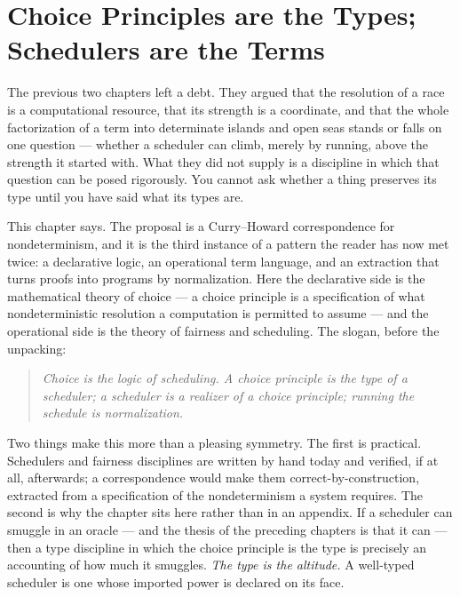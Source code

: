\chapter{Choice Principles are the Types; Schedulers are the Terms}
\label{ch:chs}

\noindent
The previous two chapters left a debt. They argued that the resolution of a race is a
computational resource, that its strength is a coordinate, and that the whole
factorization of a term into determinate islands and open seas stands or falls on one
question --- whether a scheduler can climb, merely by running, above the strength it
started with. What they did not supply is a discipline in which that question can be
posed rigorously. You cannot ask whether a thing preserves its type until you have said
what its types are.

This chapter says. The proposal is a Curry--Howard correspondence for nondeterminism,
and it is the third instance of a pattern the reader has now met twice: a declarative
logic, an operational term language, and an extraction that turns proofs into programs
by normalization. Here the declarative side is the mathematical theory of choice --- a
choice principle is a specification of what nondeterministic resolution a computation
is permitted to assume --- and the operational side is the theory of fairness and
scheduling. The slogan, before the unpacking:

\begin{quote}
\emph{Choice is the logic of scheduling. A choice principle is the type of a scheduler;
a scheduler is a realizer of a choice principle; running the schedule is
normalization.}
\end{quote}

\noindent
Two things make this more than a pleasing symmetry. The first is practical. Schedulers
and fairness disciplines are written by hand today and verified, if at all, afterwards;
a correspondence would make them correct-by-construction, extracted from a
specification of the nondeterminism a system requires. The second is why the chapter
sits here rather than in an appendix. If a scheduler can smuggle in an oracle --- and
the thesis of the preceding chapters is that it can --- then a type discipline in which
the choice principle is the type is precisely an accounting of how much it smuggles.
\emph{The type is the altitude.} A well-typed scheduler is one whose imported power is
declared on its face.

